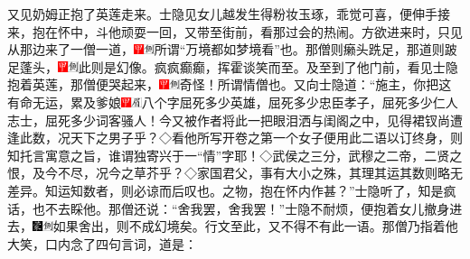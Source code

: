 又见奶姆正抱了英莲走来。士隐见女儿越发生得粉妆玉琢，乖觉可喜，便伸手接来，抱在怀中，斗他顽耍一回，又带至街前，看那过会的热闹。方欲进来时，只见从那边来了一僧一道，{\includegraphics[width=3mm]{../Images/00002}\includegraphics[width=3mm]{../Images/00011}\footnotesize \kaishu 所谓``万境都如梦境看''也。}那僧则癞头跣足，那道则跛足蓬头，{\includegraphics[width=3mm]{../Images/00002}\includegraphics[width=3mm]{../Images/00011}\footnotesize \kaishu 此则是幻像。}疯疯癫癫，挥霍谈笑而至。及至到了他门前，看见士隐抱着英莲，那僧便哭起来，{\includegraphics[width=3mm]{../Images/00002}\includegraphics[width=3mm]{../Images/00011}\footnotesize \kaishu 奇怪！所谓情僧也。}又向士隐道：``施主，你把这有命无运，累及爹娘{\includegraphics[width=3mm]{../Images/00002}\includegraphics[width=3mm]{../Images/00010}\footnotesize \kaishu 八个字屈死多少英雄，屈死多少忠臣孝子，屈死多少仁人志士，屈死多少词客骚人！今又被作者将此一把眼泪洒与闺阁之中，见得裙钗尚遭逢此数，况天下之男子乎？◇看他所写开卷之第一个女子便用此二语以订终身，则知托言寓意之旨，谁谓独寄兴于一``情''字耶！◇武侯之三分，武穆之二帝，二贤之恨，及今不尽，况今之草芥乎？◇家国君父，事有大小之殊，其理其运其数则略无差异。知运知数者，则必谅而后叹也。}之物，抱在怀内作甚？''士隐听了，知是疯话，也不去睬他。那僧还说：``舍我罢，舍我罢！''士隐不耐烦，便抱着女儿撤身进去，{\includegraphics[width=3mm]{../Images/00006}\includegraphics[width=3mm]{../Images/00011}\footnotesize \kaishu 如果舍出，则不成幻境矣。行文至此，又不得不有此一语。}那僧乃指着他大笑，口内念了四句言词，道是：

